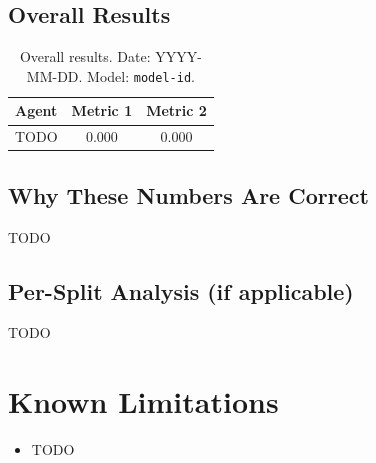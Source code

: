\documentclass[11pt]{article}
\begin{document}

\subsection{Overall Results}

\begin{table}[h]
\centering
\begin{tabular}{@{}lcc@{}}
\toprule
Agent & Metric 1 & Metric 2 \\
\midrule
TODO & 0.000 & 0.000 \\
\bottomrule
\end{tabular}
\caption{Overall results. Date: YYYY-MM-DD. Model: \texttt{model-id}.}
\end{table}

\subsection{Why These Numbers Are Correct}


TODO

\subsection{Per-Split Analysis (if applicable)}

TODO

\section{Known Limitations}
\label{sec:limitations}


\begin{itemize}
  \item TODO
\end{itemize}
\end{document}
